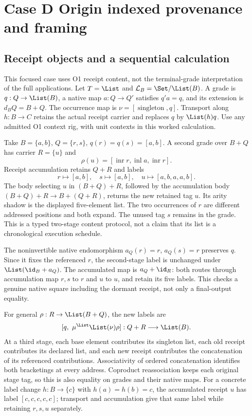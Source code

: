 \section{Case D Origin indexed provenance and framing}\label{sec:caseD}

\subsection{Receipt objects and a sequential calculation}
This focused case uses O1 receipt content, not the terminal-grade
interpretation of the full applications. Let $T=\List$ and
$\mathcal L_B=\Set/\List(B)$. A grade is $q:Q\to\List(B)$, a native
map $a:Q\to Q'$ satisfies $q'a=q$, and its extension is $d_BQ=B+Q$.
The occurrence map is $\nu=[\operatorname{singleton},q]$. Transport along
$h:B\to C$ retains the actual receipt carrier and replaces $q$ by
$\List(h)q$. Use any admitted O1 context rig, with unit contexts in this
worked calculation.

Take $B=\{a,b\}$, $Q=\{r,s\}$, $q(r)=q(s)=[a,b]$. A second grade over
$B+Q$ has carrier $R=\{u\}$ and
\[
\rho(u)=[\operatorname{inr}r,\operatorname{inl}a,
                         \operatorname{inr}r].
\]
Receipt accumulation retains $Q+R$ and labels
\[
r\mapsto[a,b],\quad s\mapsto[a,b],\quad
u\mapsto[a,b,a,a,b].
\]
The body selecting $u$ in $(B+Q)+R$, followed by the accumulation body
$(B+Q)+R\to B+(Q+R)$, returns the new retained tag $u$. Its arity
shadow is the displayed five-element list. The two occurrences of $r$
are different addressed positions and both expand. The unused tag $s$
remains in the grade. This is a typed two-stage content protocol, not a
claim that its list is a chronological execution schedule.

The noninvertible native endomorphism $a_Q(r)=r$, $a_Q(s)=r$ preserves
$q$. Since it fixes the referenced $r$, the second-stage label is
unchanged under $\List(\id_B+a_Q)$. The accumulated map is
$a_Q+\id_R$: both routes through accumulation map $r,s$ to $r$ and
$u$ to $u$, and retain its five labels. This checks a genuine native
square including the dormant receipt, not only a final-output equality.

For general $\rho:R\to\List(B+Q)$, the new labels are
\[
[q,\ \mu^{\List}\List(\nu)\rho]:Q+R\longrightarrow\List(B).
\]
At a third stage, each base element contributes its singleton list, each
old receipt contributes its declared list, and each new receipt
contributes the concatenation of its referenced contributions.
Associativity of ordered concatenation identifies both bracketings at
every address. Coproduct reassociation keeps each original stage tag,
so this is also equality on grades and their native maps. For a concrete
label change $h:B\to\{c\}$ with $h(a)=h(b)=c$, the accumulated receipt
$u$ has label $[c,c,c,c,c]$; transport and accumulation give that same
label while retaining $r,s,u$ separately.

